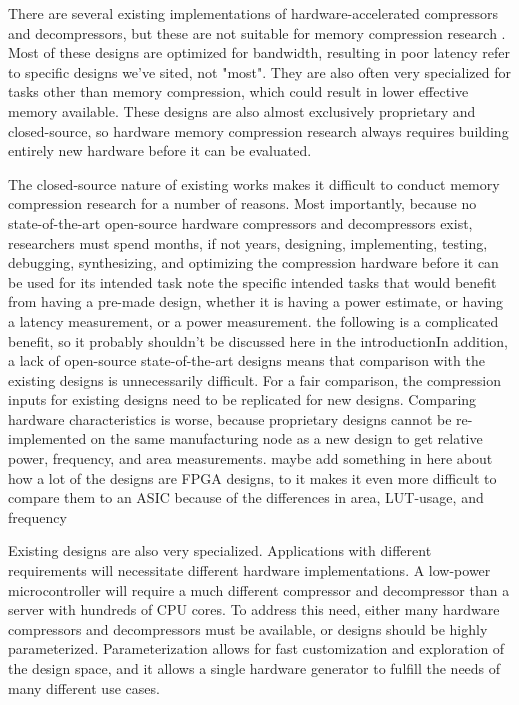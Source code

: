 \documentclass[doublespace,draft,nopageskip]{VTthesis} %
\begin{document}
There are several existing implementations of hardware-accelerated compressors and decompressors, but these are not suitable for memory compression research \cite{ibm,microsoft}. Most of these designs are optimized for bandwidth, resulting in poor latency {\color{red} refer to specific designs we've sited, not "most"}. They are also often very specialized for tasks other than memory compression, which could result in lower effective memory available. These designs are also almost exclusively proprietary and closed-source, so hardware memory compression research always requires building entirely new hardware before it can be evaluated.

The closed-source nature of existing works makes it difficult to conduct memory compression research for a number of reasons. Most importantly, because no state-of-the-art open-source hardware compressors and decompressors exist, researchers must spend months, if not years, designing, implementing, testing, debugging, synthesizing, and optimizing the compression hardware before it can be used for its intended task {\color{red} note the specific intended tasks that would benefit from having a pre-made design, whether it is having a power estimate, or having a latency measurement, or a power measurement}. {\color{red} the following is a complicated benefit, so it probably shouldn't be discussed here in the introduction}{\color{orange}In addition, a lack of open-source state-of-the-art designs means that comparison with the existing designs is unnecessarily difficult. For a fair comparison, the compression inputs for existing designs need to be replicated for new designs. Comparing hardware characteristics is worse, because proprietary designs cannot be re-implemented on the same manufacturing node as a new design to get relative power, frequency, and area measurements.}{\color{yellow} maybe add something in here about how a lot of the designs are FPGA designs, to it makes it even more difficult to compare them to an ASIC because of the differences in area, LUT-usage, and frequency}

Existing designs are also very specialized. Applications with different requirements will necessitate different hardware implementations. A low-power microcontroller will require a much different compressor and decompressor than a server with hundreds of CPU cores. To address this need, either many hardware compressors and decompressors must be available, or designs should be highly parameterized. Parameterization allows for fast customization and exploration of the design space, and it allows a single hardware generator to fulfill the needs of many different use cases.
\end{document}

